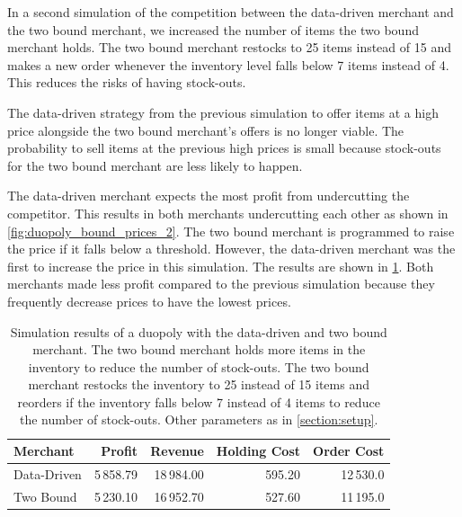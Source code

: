In a second simulation of the competition between the data-driven merchant and the two bound merchant, we increased the number of items the two bound merchant holds.
The two bound merchant restocks to 25 items instead of 15 and makes a new order whenever the inventory level falls below 7 items instead of 4.
This reduces the risks of having stock-outs.

The data-driven strategy from the previous simulation to offer items at a high price alongside the two bound merchant's offers is no longer viable.
The probability to sell items at the previous high prices is small because stock-outs for the two bound merchant are less likely to happen.

The data-driven merchant expects the most profit from undercutting the competitor.
This results in both merchants undercutting each other as shown in \cref{fig:duopoly_bound_prices_2}.
The two bound merchant is programmed to raise the price if it falls below a threshold.
However, the data-driven merchant was the first to increase the price in this simulation.
The results are shown in \cref{tab:duopoly_bound_2}.
Both merchants made less profit compared to the previous simulation because they frequently decrease prices to have the lowest prices.

\begin{table}[t]
	\centering
	\begin{tabular}{lrrrr}
		\toprule
		\textbf{Merchant} & \textbf{Profit} & \textbf{Revenue} & \textbf{Holding Cost} & \textbf{Order Cost} \\
		\midrule
		Data-Driven & 5\,858.79 & 18\,984.00 & 595.20 & 12\,530.0 \\
		Two Bound & 5\,230.10 & 16\,952.70 & 527.60 & 11\,195.0 \\
		\bottomrule
	\end{tabular}
	\caption[Simulation Results: Data-Driven Merchant versus Two Bound Merchant with Larger Inventory]{Simulation results of a duopoly with the data-driven and two bound merchant. The two bound merchant holds more items in the inventory to reduce the number of stock-outs. The two bound merchant restocks the inventory to 25 instead of 15 items and reorders if the inventory falls below 7 instead of 4 items to reduce the number of stock-outs. Other parameters as in \cref{section:setup}.}
	\label{tab:duopoly_bound_2}
\end{table}

